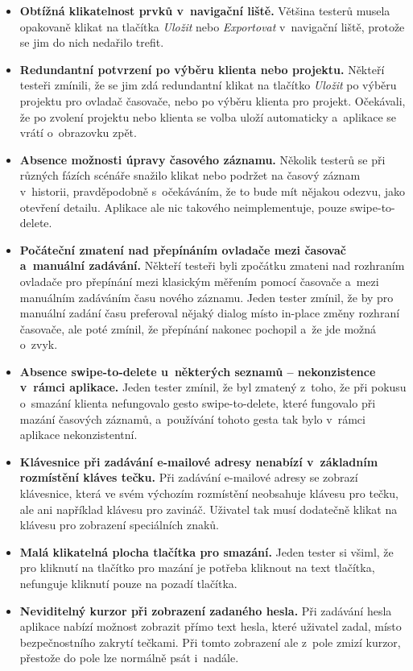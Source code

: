 \begin{itemize}
\item\textbf{Obtížná klikatelnost prvků v~navigační liště.} Většina testerů musela opakovaně klikat na tlačítka \emph{Uložit} nebo \emph{Exportovat} v~navigační liště, protože se jim do nich nedařilo trefit.
\item\textbf{Redundantní potvrzení po výběru klienta nebo projektu.} Někteří testeři zmínili, že se jim zdá redundantní klikat na tlačítko \emph{Uložit} po výběru projektu pro ovladač časovače, nebo po výběru klienta pro projekt. Očekávali, že po zvolení projektu nebo klienta se volba uloží automaticky a~aplikace se vrátí o~obrazovku zpět.
\item\textbf{Absence možnosti úpravy časového záznamu.} Několik testerů se při různých fázích scénáře snažilo klikat nebo podržet na časový záznam v~historii, pravděpodobně s~očekáváním, že to bude mít nějakou odezvu, jako otevření detailu. Aplikace ale nic takového neimplementuje, pouze swipe-to-delete.
\item\textbf{Počáteční zmatení nad přepínáním ovladače mezi časovač a~manuální zadávání.} Někteří testeři byli zpočátku zmateni nad rozhraním ovladače pro přepínání mezi klasickým měřením pomocí časovače a~mezi manuálním zadáváním času nového záznamu. Jeden tester zmínil, že by pro manuální zadání času preferoval nějaký dialog místo in-place změny rozhraní časovače, ale poté zmínil, že přepínání nakonec pochopil a~že jde možná o~zvyk.
\item\textbf{Absence swipe-to-delete u~některých seznamů – nekonzistence v~rámci aplikace.} Jeden tester zmínil, že byl zmatený z~toho, že při pokusu o~smazání klienta nefungovalo gesto swipe-to-delete, které fungovalo při mazání časových záznamů, a~používání tohoto gesta tak bylo v~rámci aplikace nekonzistentní.
\item\textbf{Klávesnice při zadávání e-mailové adresy nenabízí v~základním rozmístění kláves tečku.} Při zadávání e-mailové adresy se zobrazí klávesnice, která ve svém výchozím rozmístění neobsahuje klávesu pro tečku, ale ani například klávesu pro zavináč. Uživatel tak musí dodatečně klikat na klávesu pro zobrazení speciálních znaků.
\item\textbf{Malá klikatelná plocha tlačítka pro smazání.} Jeden tester si všiml, že pro kliknutí na tlačítko pro mazání je potřeba kliknout na text tlačítka, nefunguje kliknutí pouze na pozadí tlačítka.
\item\textbf{Neviditelný kurzor při zobrazení zadaného hesla.} Při zadávání hesla aplikace nabízí možnost zobrazit přímo text hesla, které uživatel zadal, místo bezpečnostního zakrytí tečkami. Při tomto zobrazení ale z~pole zmizí kurzor, přestože do pole lze normálně psát i~nadále.

\end{itemize}
